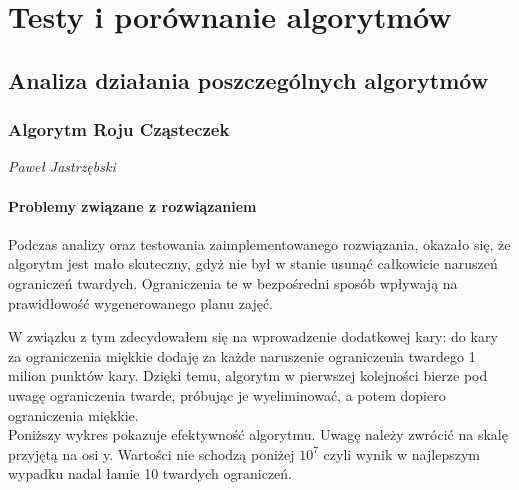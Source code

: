 \chapter{Testy i porównanie algorytmów}
\section{Analiza działania poszczególnych algorytmów}
\subsection{Algorytm Roju Cząsteczek}
\textit{Paweł Jastrzębski} \\
\subsubsection{Problemy związane z rozwiązaniem}
\par Podczas analizy oraz testowania zaimplementowanego rozwiązania, okazało się, że algorytm jest mało skuteczny, gdyż nie był w stanie usunąć całkowicie naruszeń ograniczeń twardych. Ograniczenia te w bezpośredni sposób wpływają na prawidłowość wygenerowanego planu zajęć.
\par W związku z tym zdecydowałem się na wprowadzenie dodatkowej kary: do kary za ograniczenia miękkie dodaję za każde naruszenie ograniczenia twardego 1 milion punktów kary. Dzięki temu, algorytm w pierwszej kolejności bierze pod uwagę ograniczenia twarde, próbując je wyeliminować, a potem dopiero ograniczenia miękkie. \\

Poniższy wykres pokazuje efektywność algorytmu. Uwagę należy zwrócić na skalę przyjętą na osi y. Wartości nie schodzą poniżej $10^{7}$ czyli wynik w najlepszym wypadku nadal łamie 10 twardych ograniczeń.

